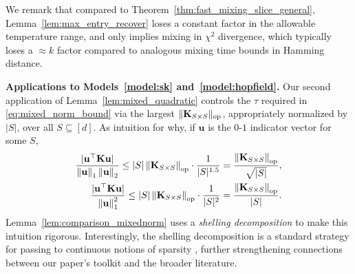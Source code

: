 \documentclass[11pt]{article}
\newcommand{\norm}[1]{\left\lVert#1\right\rVert}
\newcommand{\normop}[1]{\left\lVert#1\right\rVert_{\textup{op}}}
\newcommand{\normsop}[1]{\lVert#1\rVert_{\textup{op}}}
\newcommand{\1}{\mathbf{1}}
\newcommand{\0}{\mathbf{0}}
\newcommand{\mk}{{\mathbf{K}}}
\newcommand{\vu}{{\mathbf{u}}}
\begin{document}
We remark that compared to Theorem~\ref{thm:fast_mixing_slice_general}, Lemma~\ref{lem:max_entry_recover} loses a constant factor in the allowable temperature range, and only implies mixing in $\chi^2$ divergence, which typically loses a $\approx k$ factor compared to analogous mixing time bounds in Hamming distance.

\textbf{Applications to Models~\ref{model:sk} and~\ref{model:hopfield}.} Our second application of Lemma~\ref{lem:mixed_quadratic} controls the $\tau$ required in \eqref{eq:mixed_norm_bound} via the largest $\normsop{\mk_{S \times S}}$, appropriately normalized by $|S|$, over all $S \subseteq [d]$. As intuition for why, if $\vu$ is the $0$-$1$ indicator vector for some $S$,
\begin{align*}\frac{|\vu^\top \mk \vu|}{\norm{\vu}_1\norm{\vu}_2} \le |S|\normop{\mk_{S \times S}} \cdot \frac 1 {|S|^{1.5}} = \frac{\normop{\mk_{S \times S}}}{\sqrt{|S|}}, \\
\frac{|\vu^\top \mk \vu|}{\norm{\vu}_1^2} \le |S|\normop{\mk_{S \times S}} \cdot \frac 1 {|S|^{2}} = \frac{\normop{\mk_{S \times S}}}{|S|}.
\end{align*}
Lemma~\ref{lem:comparison_mixednorm} uses a \emph{shelling decomposition} to make this intuition rigorous. Interestingly, the shelling decomposition is a standard strategy for passing to continuous notions of sparsity \cite{CandesRT06}, further strengthening connections between our paper's toolkit and the broader literature.
\end{document}

